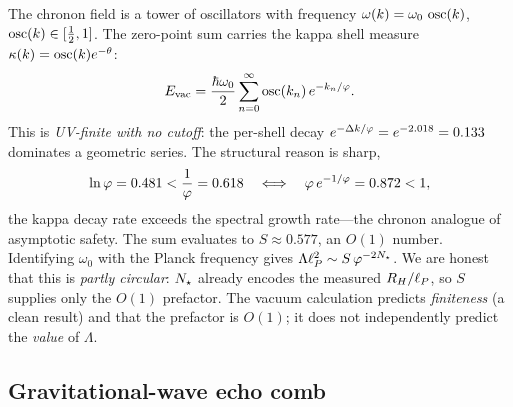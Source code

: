 The chronon field is a tower of oscillators with frequency $\omega(k)=\omega_0\,\operatorname{osc}(k)$, $\operatorname{osc}(k)\in[\tfrac12,1]$. The zero-point sum carries the kappa shell measure $\kappa(k)=\operatorname{osc}(k)e^{-\theta}$:
\begin{equation}
E_{\mathrm{vac}}=\frac{\hbar\omega_0}{2}\sum_{n=0}^{\infty}\operatorname{osc}(k_n)\,e^{-k_n/\varphi}.
\label{eq:cosmo:zpe}
\end{equation}
This is \emph{UV-finite with no cutoff}: the per-shell decay $e^{-\Delta k/\varphi}=e^{-2.018}=0.133$ dominates a geometric series. The structural reason is sharp,
\begin{equation}
\ln\varphi=0.481<\frac{1}{\varphi}=0.618
\quad\Longleftrightarrow\quad
\varphi\,e^{-1/\varphi}=0.872<1 ,
\label{eq:cosmo:finite}
\end{equation}
the kappa decay rate exceeds the spectral growth rate---the chronon analogue of asymptotic safety. The sum evaluates to $S\approx0.577$, an $O(1)$ number. Identifying $\omega_0$ with the Planck frequency gives $\Lambda\ell_{P}^{2}\sim S\,\varphi^{-2N_{\star}}$. We are honest that this is \emph{partly circular}: $N_{\star}$ already encodes the measured $R_H/\ell_{P}$, so $S$ supplies only the $O(1)$ prefactor. The vacuum calculation predicts \emph{finiteness} (a clean result) and that the prefactor is $O(1)$; it does not independently predict the \emph{value} of $\Lambda$.

\subsection{Gravitational-wave echo comb}

